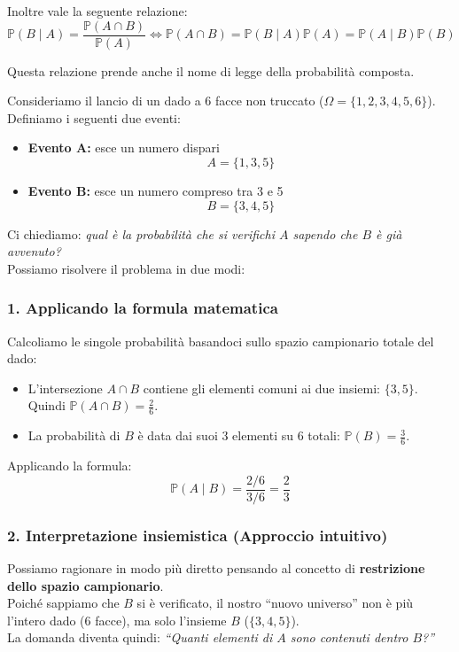 Inoltre vale la seguente relazione:
\[
\mathbb{P}(B \mid A) = \frac{\mathbb{P}(A \cap B)}{\mathbb{P}(A)} \iff \mathbb{P}(A \cap B) = \mathbb{P}(B \mid A)\mathbb{P}(A) = \mathbb{P}(A \mid B)\mathbb{P}(B)
\]

Questa relazione prende anche il nome di legge della probabilità composta.

\begin{esempio}

Consideriamo il lancio di un dado a 6 facce non truccato ($\Omega = \{1, 2, 3, 4, 5, 6\}$). Definiamo i seguenti due eventi:
\begin{itemize}
    \item \textbf{Evento A:} esce un numero dispari
    \[ A = \{1, 3, 5\} \]
    \item \textbf{Evento B:} esce un numero compreso tra 3 e 5
    \[ B = \{3, 4, 5\} \]
\end{itemize}

Ci chiediamo: \emph{qual è la probabilità che si verifichi $A$ sapendo che $B$ è già avvenuto?}
\\Possiamo risolvere il problema in due modi:

\subsubsection*{1. Applicando la formula matematica}

Calcoliamo le singole probabilità basandoci sullo spazio campionario totale del dado:
\begin{itemize}
    \item L'intersezione $A \cap B$ contiene gli elementi comuni ai due insiemi: $\{3, 5\}$.
    \\Quindi $\mathbb{P}(A \cap B) = \frac{2}{6}$.
    \item La probabilità di $B$ è data dai suoi 3 elementi su 6 totali: $\mathbb{P}(B) = \frac{3}{6}$.
\end{itemize}

Applicando la formula:
\[
\mathbb{P}(A \mid B) = \frac{2/6}{3/6} = \frac{2}{3}
\]

\subsubsection*{2. Interpretazione insiemistica (Approccio intuitivo)}

Possiamo ragionare in modo più diretto pensando al concetto di \textbf{restrizione dello spazio campionario}.
\\Poiché sappiamo che $B$ si è verificato, il nostro ``nuovo universo'' non è più l'intero dado (6 facce), ma solo l'insieme $B$ ($\{3, 4, 5\}$).
\\La domanda diventa quindi: \emph{``Quanti elementi di $A$ sono contenuti dentro $B$?''}


\end{esempio}
